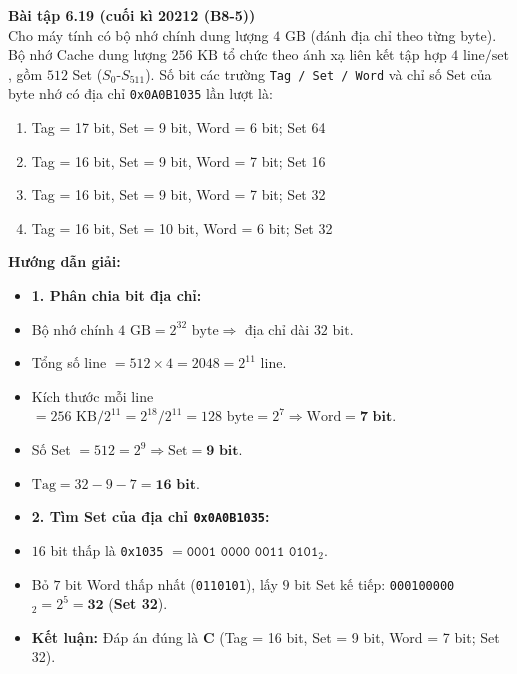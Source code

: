 \textbf{Bài tập 6.19 (cuối kì 20212 (B8-5))}\\
Cho máy tính có bộ nhớ chính dung lượng $4\text{ GB}$ (đánh địa chỉ theo từng byte). Bộ nhớ Cache dung lượng $256\text{ KB}$ tổ chức theo ánh xạ liên kết tập hợp $4\text{ line/set}$, gồm $512$ Set ($S_0\text{-}S_{511}$). Số bit các trường \texttt{Tag / Set / Word} và chỉ số Set của byte nhớ có địa chỉ \texttt{0x0A0B1035} lần lượt là:
\begin{enumerate}[label=\Alph*.]
    \item Tag = 17 bit, Set = 9 bit, Word = 6 bit; Set 64
    \item Tag = 16 bit, Set = 9 bit, Word = 7 bit; Set 16
    \item Tag = 16 bit, Set = 9 bit, Word = 7 bit; Set 32
    \item Tag = 16 bit, Set = 10 bit, Word = 6 bit; Set 32
\end{enumerate}
\textbf{Hướng dẫn giải:}
\begin{itemize}
    \item \textbf{1. Phân chia bit địa chỉ:}
    \item Bộ nhớ chính $4\text{ GB} = 2^{32}\text{ byte} \Rightarrow$ địa chỉ dài $32\text{ bit}$.
    \item Tổng số line $= 512 \times 4 = 2048 = 2^{11}$ line.
    \item Kích thước mỗi line $= 256\text{ KB} / 2^{11} = 2^{18} / 2^{11} = 128\text{ byte} = 2^7 \Rightarrow \text{Word} = \mathbf{7\text{ bit}}$.
    \item Số Set $= 512 = 2^9 \Rightarrow \text{Set} = \mathbf{9\text{ bit}}$.
    \item $\text{Tag} = 32 - 9 - 7 = \mathbf{16\text{ bit}}$.
    \item \textbf{2. Tìm Set của địa chỉ \texttt{0x0A0B1035}:}
    \item $16$ bit thấp là \texttt{0x1035} $= \texttt{0001 0000 0011 0101}_2$.
    \item Bỏ $7$ bit Word thấp nhất (\texttt{0110101}), lấy $9$ bit Set kế tiếp: \texttt{000100000}$_2 = 2^5 = \mathbf{32}$ (\textbf{Set 32}).
    \item \textbf{Kết luận:} Đáp án đúng là \textbf{C} (Tag = 16 bit, Set = 9 bit, Word = 7 bit; Set 32).
\end{itemize}


